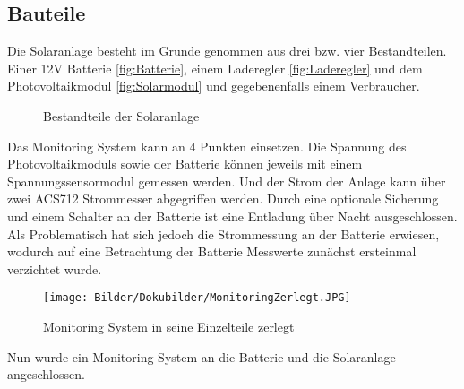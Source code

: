 \documentclass[ngerman]{mucproc}
\begin{document}
	\subsection{Bauteile}
		

	Die Solaranlage besteht im Grunde genommen aus drei bzw. vier Bestandteilen. Einer 12V Batterie \ref{fig:Batterie}, einem Laderegler \ref{fig:Laderegler} und dem Photovoltaikmodul \ref{fig:Solarmodul} und gegebenenfalls einem Verbraucher.

\begin{figure}\centering
{}\hfill
{}\par 
{}
\caption{Bestandteile der Solaranlage}
\label{fig:Solaranlage Bestandteile}
\end{figure}


	Das Monitoring System kann an 4 Punkten einsetzen. Die Spannung des Photovoltaikmoduls sowie der Batterie können jeweils mit einem Spannungssensormodul gemessen werden. Und der Strom der Anlage kann über zwei ACS712 Strommesser abgegriffen werden. Durch eine optionale Sicherung und einem Schalter an der Batterie ist eine Entladung über Nacht ausgeschlossen. Als Problematisch hat sich jedoch die Strommessung an der Batterie erwiesen, wodurch auf eine Betrachtung der Batterie Messwerte zunächst ersteinmal verzichtet wurde. 

\begin{figure}
			\centering
			\texttt{[image: Bilder/Dokubilder/MonitoringZerlegt.JPG]}
			\caption{Monitoring System in seine Einzelteile zerlegt}
			\label{fig:Monitoring zerlegt}
		\end{figure}	
	
	
	 
\newpage
Nun wurde ein Monitoring System an die Batterie und die Solaranlage angeschlossen. 
\end{document}
